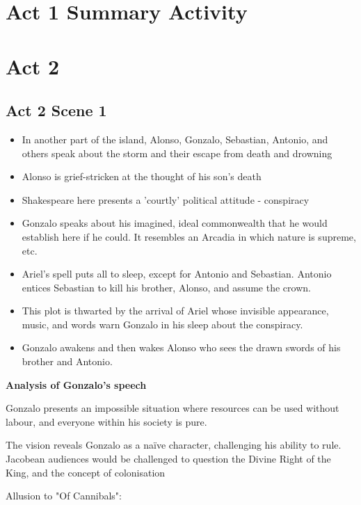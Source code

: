 \section{Act 1 Summary Activity}
	

\section{Act 2} \label{24/02/2025}
	
	\subsection{Act 2 Scene 1}
	
		\begin{itemize}
			\item In another part of the island, Alonso, Gonzalo, Sebastian, Antonio, and others speak about the storm and their escape from death and drowning
			\item Alonso is grief-stricken at the thought of his son's death
			\item Shakespeare here presents a 'courtly' political attitude - conspiracy
			\item Gonzalo speaks about his imagined, ideal commonwealth that he would establish here if he could. It resembles an Arcadia in which nature is supreme, etc.
			\item Ariel's spell puts all to sleep, except for Antonio and Sebastian. Antonio entices Sebastian to kill his brother, Alonso, and assume the crown.
			\item This plot is thwarted by the arrival of Ariel whose invisible appearance, music, and words warn Gonzalo in his sleep about the conspiracy.
			\item Gonzalo awakens and then wakes Alonso who sees the drawn swords of his brother and Antonio.
		\end{itemize}

		\textbf{Analysis of Gonzalo's speech}

			Gonzalo presents an impossible situation where resources can be used without labour, and everyone within his society is pure.

			The vision reveals Gonzalo as a naïve character, challenging his ability to rule. Jacobean audiences would be challenged to question the Divine Right of the King, and the concept of colonisation

			Allusion to "Of Cannibals":

